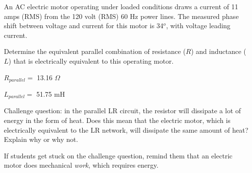 

An AC electric motor operating under loaded conditions draws a current of 11 amps (RMS) from the 120 volt (RMS) 60 Hz power lines.  The measured phase shift between voltage and current for this motor is 34$^{o}$, with voltage leading current.

Determine the equivalent parallel combination of resistance ($R$) and inductance ($L$) that is electrically equivalent to this operating motor.







$R_{parallel} =$ 13.16 $\Omega$

\vskip 10pt

$L_{parallel} =$ 51.75 mH

\vskip 10pt

Challenge question: in the parallel LR circuit, the resistor will dissipate a lot of energy in the form of heat.  Does this mean that the electric motor, which is electrically equivalent to the LR network, will dissipate the same amount of heat?  Explain why or why not.







If students get stuck on the challenge question, remind them that an electric motor does mechanical {\it work}, which requires energy.




